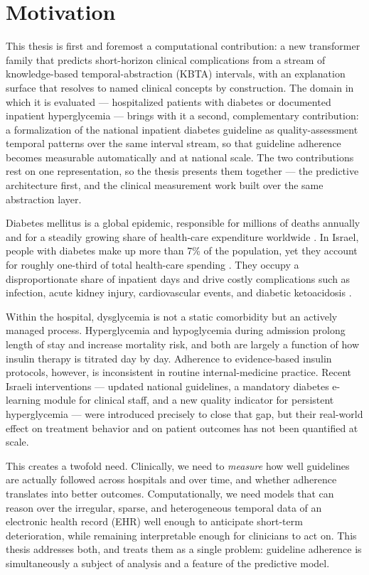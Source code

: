 \section{Motivation}

This thesis is first and foremost a computational contribution: a new
transformer family that predicts short-horizon clinical complications from a
stream of knowledge-based temporal-abstraction (KBTA) intervals, with an
explanation surface that resolves to named clinical concepts by construction.
The domain in which it is evaluated --- hospitalized patients with diabetes
or documented inpatient hyperglycemia --- brings with it a second,
complementary contribution: a formalization of the national inpatient
diabetes guideline as quality-assessment temporal patterns over the same
interval stream, so that guideline adherence becomes measurable
automatically and at national scale. The two contributions rest on one
representation, so the thesis presents them together --- the predictive
architecture first, and the clinical measurement work built over the same
abstraction layer.

Diabetes mellitus is a global epidemic, responsible for millions of deaths annually and for a steadily growing share of health-care expenditure worldwide \citep{idf-atlas-10th-edition-2021}. In Israel, people with diabetes make up more than 7\% of the population, yet they account for roughly one-third of total health-care spending \citep{israel-national-center-disease-control-diabetes-registry-report-2012-2022}. They occupy a disproportionate share of inpatient days and drive costly complications such as infection, acute kidney injury, cardiovascular events, and diabetic ketoacidosis \citep{summary-cost-diabetes-israel-2018}.

Within the hospital, dysglycemia is not a static comorbidity but an actively managed process. Hyperglycemia and hypoglycemia during admission prolong length of stay and increase mortality risk, and both are largely a function of how insulin therapy is titrated day by day. Adherence to evidence-based insulin protocols, however, is inconsistent in routine internal-medicine practice. Recent Israeli interventions --- updated national guidelines, a mandatory diabetes e-learning module for clinical staff, and a new quality indicator for persistent hyperglycemia --- were introduced precisely to close that gap, but their real-world effect on treatment behavior and on patient outcomes has not been quantified at scale.

This creates a twofold need. Clinically, we need to \emph{measure} how well guidelines are actually followed across hospitals and over time, and whether adherence translates into better outcomes. Computationally, we need models that can reason over the irregular, sparse, and heterogeneous temporal data of an electronic health record (EHR) well enough to anticipate short-term deterioration, while remaining interpretable enough for clinicians to act on. This thesis addresses both, and treats them as a single problem: guideline adherence is simultaneously a subject of analysis and a feature of the predictive model.

